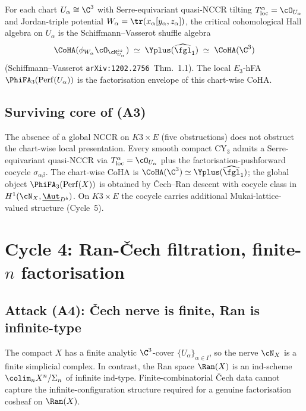\begin{corollary}
\label{cor:chart-coha-quasi-nccr}
For each chart $U_\alpha \cong \C^3$ with Serre-equivariant quasi-NCCR
tilting $T_{\mathrm{loc}}^\alpha = \cO_{U_\alpha}$ and Jordan-triple
potential $W_\alpha = \tr(x_\alpha [y_\alpha, z_\alpha])$, the critical
cohomological Hall algebra on $U_\alpha$ is the Schiffmann--Vasserot
shuffle algebra
\[
  \CoHA(\phi_{W_\alpha} \cO_{\cM^{ss}_{U_\alpha}}) \;\simeq\;
  \Yplus(\widehat{\fgl}_1) \;\simeq\; \CoHA(\C^3)
\]
(Schiffmann--Vasserot \texttt{arXiv:1202.2756}~Thm.~1.1). The local
$E_3$-hFA $\PhiFA_3(\mathrm{Perf}(U_\alpha))$ is the factorisation
envelope of this chart-wise CoHA.
\end{corollary}

\subsection*{Surviving core of (A3)}

The absence of a global NCCR on $K3 \times E$ (five obstructions) does
not obstruct the chart-wise local presentation. Every smooth compact
CY$_3$ admits a Serre-equivariant quasi-NCCR via $T_{\mathrm{loc}}^\alpha
= \cO_{U_\alpha}$ plus the factorisation-pushforward cocycle
$\sigma_{\alpha\beta}$. The chart-wise CoHA is $\CoHA(\C^3) \simeq
\Yplus(\widehat{\fgl}_1)$; the global object $\PhiFA_3(\mathrm{Perf}(X))$
is obtained by Čech--Ran descent with cocycle class in
$H^1(\cN_X, \underline{\Aut}_{D^b})$. On $K3 \times E$ the cocycle
carries additional Mukai-lattice-valued structure (Cycle~5).

\section{Cycle 4: Ran-Čech filtration, finite-$n$ factorisation}

\subsection*{Attack (A4): Čech nerve is finite, Ran is infinite-type}

The compact $X$ has a finite analytic $\C^3$-cover $\{U_\alpha\}_{\alpha
\in I}$, so the nerve $\cN_X$ is a finite simplicial complex. In
contrast, the Ran space $\Ran(X)$ is an ind-scheme $\colim_n X^n /
\Sigma_n$ of infinite ind-type. Finite-combinatorial Čech data
cannot capture the infinite-configuration structure required for a
genuine factorisation cosheaf on $\Ran(X)$.

